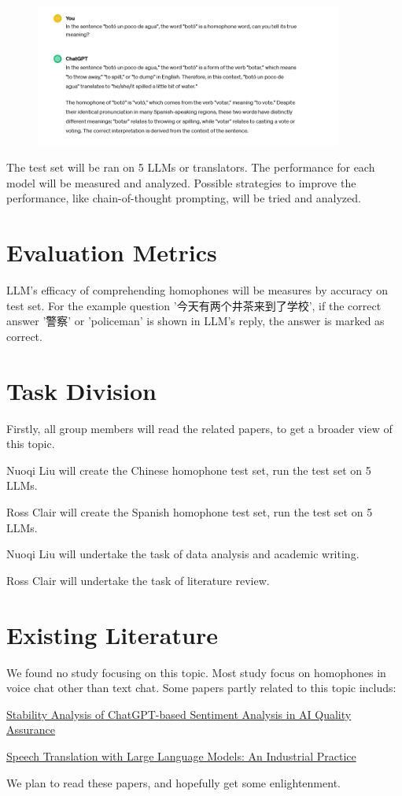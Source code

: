 \documentclass{article}
\begin{document}
\begin{figure}[h]
    \centering
    \includegraphics[width=0.9\textwidth]{example_question_spanish.png}
\end{figure}

The test set will be ran on 5 LLMs or translators. The performance for each model will be measured and analyzed. Possible strategies to improve the performance, like chain-of-thought prompting, will be tried and analyzed.

\section{Evaluation Metrics}

LLM's efficacy of comprehending homophones will be measures by accuracy on test set. For the example question '今天有两个井茶来到了学校', if the correct answer '警察' or 'policeman' is shown in LLM's reply, the answer is marked as correct.

\section{Task Division}

Firstly, all group members will read the related papers, to get a broader view of this topic.

Nuoqi Liu will create the Chinese homophone test set, run the test set on 5 LLMs.

Ross Clair will create the Spanish homophone test set, run the test set on 5 LLMs.

Nuoqi Liu will undertake the task of data analysis and academic writing.

Ross Clair will undertake the task of literature review.

\section{Existing Literature}

We found no study focusing on this topic. Most study focus on homophones in voice chat other than text chat. Some papers partly related to this topic includs:

\href{https://arxiv.org/abs/2401.07441}{Stability Analysis of ChatGPT-based Sentiment Analysis in AI Quality Assurance}

\href{https://arxiv.org/abs/2312.13585}{Speech Translation with Large Language Models: An Industrial Practice}

We plan to read these papers, and hopefully get some enlightenment.
\end{document}
